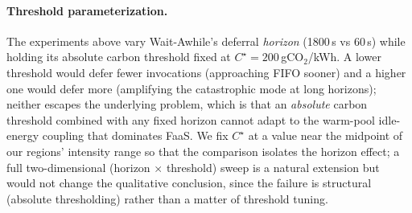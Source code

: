\paragraph{Threshold parameterization.} The experiments above vary
Wait-Awhile's deferral \emph{horizon} (1800\,s vs 60\,s) while holding
its absolute carbon threshold fixed at $C^\star = 200$\,gCO$_2$/kWh.
A lower threshold would defer fewer invocations (approaching FIFO
sooner) and a higher one would defer more (amplifying the
catastrophic mode at long horizons); neither escapes the underlying
problem, which is that an \emph{absolute} carbon threshold combined
with any fixed horizon cannot adapt to the warm-pool idle-energy
coupling that dominates FaaS. We fix $C^\star$ at a value near the
midpoint of our regions' intensity range so that the comparison
isolates the horizon effect; a full two-dimensional
(horizon $\times$ threshold) sweep is a natural extension but would
not change the qualitative conclusion, since the failure is structural
(absolute thresholding) rather than a matter of threshold tuning.
